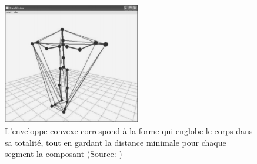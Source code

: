 \begin{figure}[h]
    \centering
    \includegraphics[width=6cm]{pictures/convex_hull.png}
    \caption[Enveloppe convexe]{L'enveloppe convexe correspond à la forme qui englobe le corps dans sa totalité, tout en gardant la distance minimale pour chaque segment la composant (Source: \parencite{Hachimura2005Aae})}
    \label{fig:convex_hull}
\end{figure}


